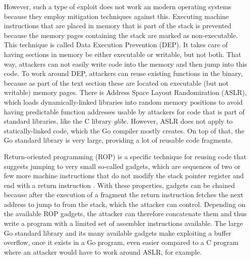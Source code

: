 However, such a type of exploit does not work an modern operating systems because they employ mitigation techniques
against this.
Executing machine instructions that are placed in memory that is part of the stack is prevented because the memory pages
containing the stack are marked as non-executable.
This technique is called Data Execution Prevention (\acrshort{DEP}).
It takes care of having sections in memory be either executable or writable, but not both.
That way, attackers can not easily write code into the memory and then jump into this code.
To work around \acrshort{DEP}, attackers can reuse existing functions in the binary, because as part of the text section
these are located on executable (but not writable) memory pages.
There is Address Space Layout Randomization (\acrshort{ASLR}), which loads dynamically-linked libraries into random
memory positions to avoid having predictable function addresses usable by attackers for code that is part of standard
libraries, like the C library \textit{glibc}.
However, \acrshort{ASLR} does not apply to statically-linked code, which the Go compiler mostly creates.
On top of that, the Go standard library is very large, providing a lot of reusable code fragments.

Return-oriented programming (\acrshort{ROP}) is a specific technique for reusing code that suggests jumping to very
small so-called gadgets, which are sequences of two or few more machine instructions that do not modify the stack
pointer register and end with a return instruction .
With these properties, gadgets can be chained because after the execution of a fragment the return instruction fetches
the next address to jump to from the stack, which the attacker can control.
Depending on the available \acrshort{ROP} gadgets, the attacker can therefore concatenate them and thus write a program
with a limited set of assembler instructions available.
The large Go standard library and its many available gadgets make exploiting a buffer overflow, once it exists in a Go
program, even easier compared to a C program where an attacker would have to work around \acrshort{ASLR}, for example.


